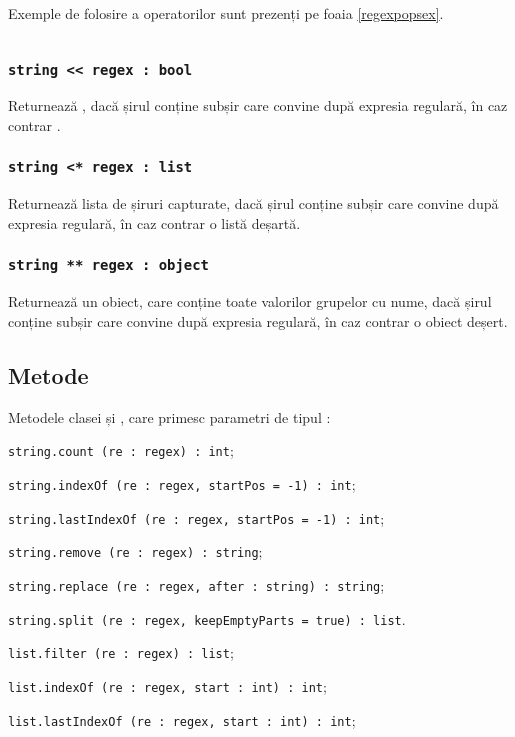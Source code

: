 Exemple de folosire a operatorilor sunt prezenți pe foaia \ref{regexpopsex}.

\begin{sourcecode}
    \label{regexpopsex}
    \inputminted[linenos]{icl}{../sources/regexpopsex.icL}
\end{sourcecode}

\subsubsection{\texttt{string << regex : bool}}

Returnează \true{}, dacă șirul conține subșir care convine după expresia regulară, în caz contrar \false{}.

\subsubsection{\texttt{string <* regex : list}}

Returnează lista de șiruri capturate, dacă șirul conține subșir care convine după expresia regulară, în caz contrar o listă deșartă.

\subsubsection{\texttt{string ** regex : object}}

Returnează un obiect, care conține toate valorilor grupelor cu nume, dacă șirul conține subșir care convine după expresia regulară, în caz contrar o obiect deșert.


\subsection{Metode}

Metodele clasei \str{} și \listtype, care primesc parametri de tipul \regex{}:
\begin{icItems}
\item
\texttt{string.count (re : regex) : int};
\item
\texttt{string.indexOf (re : regex, startPos = -1) : int};
\item
\texttt{string.lastIndexOf (re : regex, startPos = -1) : int};
\item
\texttt{string.remove (re : regex) : string};
\item 
\texttt{string.replace (re : regex, after : string) : string};
\item
\texttt{string.split (re : regex, keepEmptyParts = true) : list}.
\item
\texttt{list.filter (re : regex) : list};
\item
\texttt{list.indexOf (re : regex, start : int) : int};
\item
\texttt{list.lastIndexOf (re : regex, start : int) : int};
\end{icItems}

